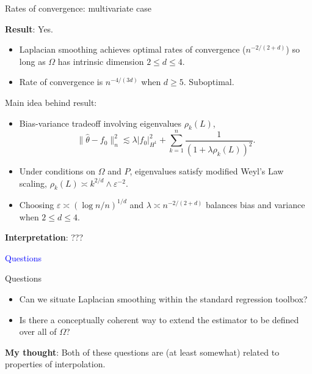 \documentclass[xcolor=dvipsnames]{beamer}
\newcommand{\wh}[1]{\widehat{#1}}
\newcommand{\blue}[1]{\textcolor{blue}{#1}}
\begin{document}
\begin{frame}[t]{Rates of convergence: multivariate case}

{\bf Result}: Yes. 
\begin{itemize}
	\item Laplacian smoothing achieves optimal rates of convergence ($n^{-2/(2 + d)}$) so long as $\Omega$ has intrinsic dimension $2 \leq d \leq 4$.
	\item Rate of convergence is $n^{-4/(3d)}$ when $d \geq 5$. Suboptimal.
\end{itemize}
\pause
Main idea behind result: 
\begin{itemize}
	\item Bias-variance tradeoff involving eigenvalues $\rho_k(L)$,
	\begin{equation*}
	\|\wh{\theta} - f_0\|_n^2 \lesssim \lambda |f_0|_{H^1}^2 + \sum_{k = 1}^{n}\frac{1}{(1 + \lambda \rho_k(L))^2}.
	\end{equation*}
	\item Under conditions on $\Omega$ and $P$, eigenvalues satisfy modified Weyl's Law scaling, $\rho_k(L) \asymp k^{2/d} \wedge \varepsilon^{-2}$.
	\item Choosing $\varepsilon \asymp (\log n/n)^{1/d}$ and $\lambda \asymp n^{-2/(2+ d)}$ balances bias and variance when $2 \leq d \leq 4$.
\end{itemize}
\pause
{\bf Interpretation}: ???
\end{frame}

\begin{frame}
\centering
\huge
\blue{Questions}
\end{frame}

\begin{frame}[t]{Questions}
\begin{itemize}
	\item Can we situate Laplacian smoothing within the standard regression toolbox?
	\item Is there a conceptually coherent way to extend the estimator to be defined over all of $\Omega$?
\end{itemize}
\textbf{My thought}: Both of these questions are (at least somewhat) related to properties of interpolation.
\end{frame}
\end{document}

